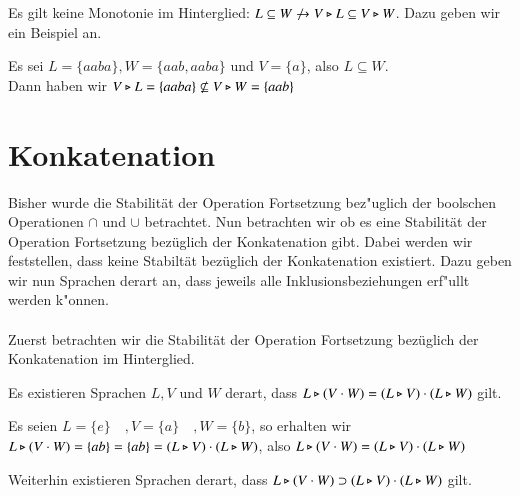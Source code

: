 Es gilt keine Monotonie im Hinterglied: $L\subseteq W \not\to V\triangleright L \subseteq V \triangleright W$. Dazu geben wir ein Beispiel an.

\vspace{2ex}

\begin{beispiel}
Es sei $L=\{aaba\},W=\{aab,aaba\}$ und $V=\{a\}$, also $L\subseteq W$.\\
Dann haben wir $V\triangleright L = \{aaba\} \not\subseteq V\triangleright W =\{aab\}$
\end{beispiel}



\section{Konkatenation}
Bisher wurde die Stabilität der Operation Fortsetzung bez"uglich der boolschen Operationen $\cap$ und $\cup$ betrachtet.
Nun betrachten wir ob es eine Stabilität der Operation Fortsetzung bezüglich der Konkatenation gibt.
Dabei werden wir feststellen, dass keine Stabiltät bezüglich der Konkatenation existiert. Dazu geben wir nun Sprachen derart an, dass jeweils alle Inklusionsbeziehungen erf"ullt werden k"onnen.\\\\
Zuerst betrachten wir die Stabilität der Operation Fortsetzung bezüglich der Konkatenation im Hinterglied.

Es existieren Sprachen $L,V$ und $W$ derart, dass $L\triangleright (V\cdot W) = (L\triangleright V) \cdot (L\triangleright W)$ gilt.

\vspace{2ex}

\begin{beispiel}
Es seien  $L=\{e\}\quad ,V=\{a\}\quad ,W=\{b\} $, so erhalten wir \\
$L\triangleright (V\cdot W) = \{ ab\} =  \{ab\} = (L\triangleright V) \cdot (L\triangleright W)$, also $L\triangleright (V\cdot W) = (L\triangleright V) \cdot (L\triangleright W)$
\end{beispiel}
Weiterhin existieren Sprachen derart, dass $L\triangleright (V\cdot W) \supset (L\triangleright V) \cdot (L\triangleright W)$ gilt.

